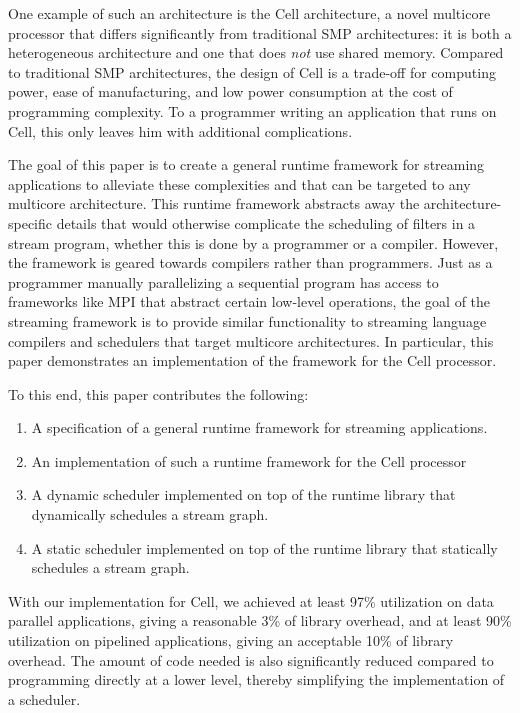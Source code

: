 One example of such an architecture is the Cell architecture, a novel multicore processor that differs significantly from traditional SMP architectures: it is both a heterogeneous architecture and one that does \emph{not} use shared memory. Compared to traditional SMP architectures, the design of Cell is a trade-off for computing power, ease of manufacturing, and low power consumption at the cost of programming complexity. To a programmer writing an application that runs on Cell, this only leaves him with additional complications.

The goal of this paper is to create a general runtime framework for streaming applications to alleviate these complexities and that can be targeted to any multicore architecture. This runtime framework abstracts away the architecture-specific details that would otherwise complicate the scheduling of filters in a stream program, whether this is done by a programmer or a compiler. However, the framework is geared towards compilers rather than programmers. Just as a programmer manually parallelizing a sequential program has access to frameworks like MPI that abstract certain low-level operations, the goal of the streaming framework is to provide similar functionality to streaming language compilers and schedulers that target multicore architectures. In particular, this paper demonstrates an implementation of the framework for the Cell processor.

To this end, this paper contributes the following:
\begin{enumerate}
\item A specification of a general runtime framework for streaming applications.
\item An implementation of such a runtime framework for the Cell processor
\item A dynamic scheduler implemented on top of the runtime library that dynamically schedules a stream graph.
\item A static scheduler implemented on top of the runtime library that statically schedules a stream graph.
\end{enumerate}

With our implementation for Cell, we achieved at least 97\% utilization on data parallel applications, giving a reasonable 3\% of library overhead, and at least 90\% utilization on pipelined applications, giving an acceptable 10\% of library overhead. The amount of code needed is also significantly reduced compared to programming directly at a lower level, thereby simplifying the implementation of a scheduler.


